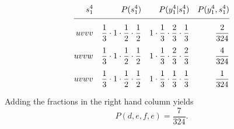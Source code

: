 \begin{subequations}
\label{eq:pcalc}
 \begin{align}
  \ts{s}{1}{4} & & P(\ts{s}{1}{4}) %
                & & P(\ts{y}{1}{4}|\ts{s}{1}{4}) %
                 & & P(\ts{y}{1}{4},\ts{s}{1}{4})\nonumber\\[1ex]
  \hline\nonumber\\[-2ex]
  uvvv         & & \frac{1}{3} \cdot 1 \cdot \frac{1}{2} \cdot \frac{1}{2} %
                & & 1 \cdot \frac{1}{3} \cdot \frac{2}{3} \cdot \frac{1}{3} %
                 & & \frac{2}{324}\\[1ex]
  uvvw         & & \frac{1}{3} \cdot 1 \cdot \frac{1}{2} \cdot \frac{1}{2} %
                & & 1 \cdot \frac{1}{3} \cdot \frac{2}{3} \cdot \frac{2}{3} %
                 & & \frac{4}{324}\\[1ex]
  uvwv         & & \frac{1}{3} \cdot 1 \cdot \frac{1}{2} \cdot \frac{1}{2} %
                & & 1 \cdot \frac{1}{3} \cdot \frac{1}{3} \cdot \frac{1}{3} %
                 & & \frac{1}{324}
 \end{align}
\end{subequations}

Adding the fractions in the right hand column yields %
\begin{equation*}
  P(d,e,f,e) = \frac{7}{324}.
\end{equation*}

